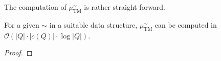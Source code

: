 The computation of $\mu_\text{TM}^\sim$ is rather straight forward. 

\begin{theorem}
	For a given $\sim$ in a suitable data structure, $\mu_\text{TM}^\sim$ can be computed in $\mathcal{O}(|Q| \cdot |c(Q)| \cdot \log |Q|)$.
\end{theorem}

\begin{proof}
\end{proof}











